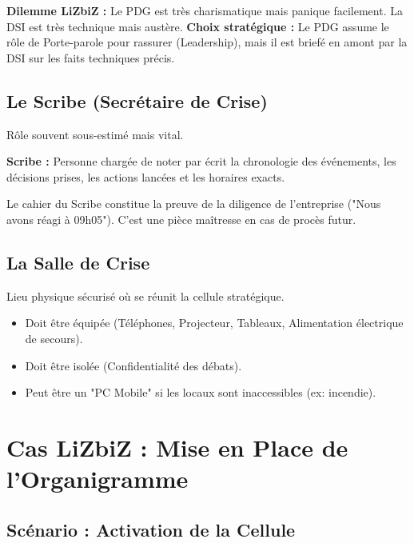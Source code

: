 \begin{boxlizbiz}
\textbf{Dilemme LiZbiZ :}
Le PDG est très charismatique mais panique facilement. La DSI est très technique mais austère.
\textbf{Choix stratégique :} Le PDG assume le rôle de Porte-parole pour rassurer (Leadership), mais il est briefé en amont par la DSI sur les faits techniques précis.
\end{boxlizbiz}

\subsection{Le Scribe (Secrétaire de Crise)}

Rôle souvent sous-estimé mais vital.

\begin{boxdef}
\textbf{Scribe :} Personne chargée de noter par écrit la chronologie des événements, les décisions prises, les actions lancées et les horaires exacts.
\end{boxdef}

Le cahier du Scribe constitue la preuve de la diligence de l'entreprise ("Nous avons réagi à 09h05"). C'est une pièce maîtresse en cas de procès futur.

\subsection{La Salle de Crise}

Lieu physique sécurisé où se réunit la cellule stratégique.
\begin{itemize}
    \item Doit être équipée (Téléphones, Projecteur, Tableaux, Alimentation électrique de secours).
    \item Doit être isolée (Confidentialité des débats).
    \item Peut être un "PC Mobile" si les locaux sont inaccessibles (ex: incendie).
\end{itemize}

\section{Cas LiZbiZ : Mise en Place de l'Organigramme}

\subsection{Scénario : Activation de la Cellule}


